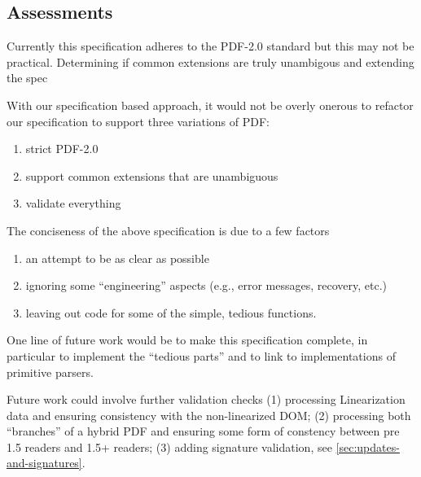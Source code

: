 
\subsection{Assessments}

Currently this specification adheres to the PDF-2.0 standard but this
may not be practical.
%
Determining if common extensions are truly unambigous and extending
the spec 

With our specification based approach, it would not be overly onerous
to refactor our specification to support three variations of PDF:
\begin{enumerate}
\item strict PDF-2.0
\item support common extensions that are unambiguous
\item validate everything
\end{enumerate}

The conciseness of the above specification is due to a few factors
\begin{enumerate}
\item an attempt to be as clear as possible
\item ignoring some ``engineering'' aspects (e.g., error
   messages, recovery, etc.)
\item leaving out code for some of the simple, tedious functions.
\end{enumerate}
One line of future work would be to make this specification complete,
in particular to implement the ``tedious parts'' and to link to
implementations of primitive parsers.

Future work could involve further validation checks
(1) processing Linearization data and ensuring consistency with the
non-linearized DOM;
(2) processing both ``branches'' of a hybrid PDF and ensuring
some form of constency between pre 1.5 readers and 1.5+ readers;
(3) adding signature validation, see \cref{sec:updates-and-signatures}.
